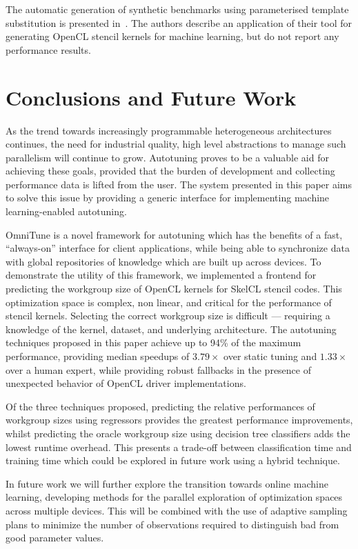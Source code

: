   The automatic generation of synthetic benchmarks using parameterised
  template substitution is presented in~\cite{Chiu2015}. The authors
  describe an application of their tool for generating OpenCL stencil
  kernels for machine learning, but do not report any performance
  results.


  \section{Conclusions and Future Work}\label{sec:conclusions}

  As the trend towards increasingly programmable heterogeneous
  architectures continues, the need for industrial quality, high level
  abstractions to manage such parallelism will continue to
  grow. Autotuning proves to be a valuable aid for achieving these
  goals, provided that the burden of development and collecting
  performance data is lifted from the user. The system presented in this
  paper aims to solve this issue by providing a generic interface for
  implementing machine learning-enabled autotuning.

  OmniTune is a novel framework for autotuning which has the benefits of
  a fast, ``always-on'' interface for client applications, while being
  able to synchronize data with global repositories of knowledge which
  are built up across devices. To demonstrate the utility of this
  framework, we implemented a frontend for predicting the workgroup size
  of OpenCL kernels for SkelCL stencil codes. This optimization space is
  complex, non linear, and critical for the performance of stencil
  kernels. Selecting the correct workgroup size is difficult ---
  requiring a knowledge of the kernel, dataset, and underlying
  architecture. The autotuning techniques proposed in this paper achieve
  up to 94\% of the maximum performance, providing median speedups of
  $3.79\times$ over static tuning and $1.33\times$ over a human expert, while providing robust fallbacks in the presence of unexpected behavior of OpenCL driver implementations.

  Of the three techniques proposed, predicting the relative performances
  of workgroup sizes using regressors provides the greatest performance
  improvements, whilst predicting the oracle workgroup size using
  decision tree classifiers adds the lowest runtime overhead. This
  presents a trade-off between classification time and training time
  which could be explored in future work using a hybrid technique.

  In future work we will further explore the transition towards online
  machine learning, developing methods for the parallel exploration of
  optimization spaces across multiple devices. This will be combined
  with the use of adaptive sampling plans to minimize the number of
  observations required to distinguish bad from good parameter values.

